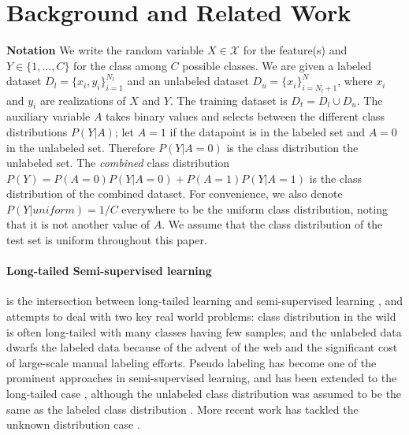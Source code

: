 \section{Background and Related Work}
\label{sec:background}

\textbf{Notation} We write the random variable $X \in \mathcal{X}$ for the feature(s) and  $Y \in \{1,\dots, C\}$ for the class among $C$ possible classes. We are given a labeled dataset $D_l = \{x_i,y_i\}_{i=1}^{N_l}$ and an unlabeled dataset $D_u = \{x_i\}_{i=N_l+1}^N$, where $x_i$ and $y_i$ are realizations of $X$ and $Y$. The training dataset is $D_t = D_l \cup D_u$. 
The auxiliary variable $A$ takes binary values and selects between the different class distributions $P(Y|A)$; let $A=1$ if the datapoint is in the labeled set and $A=0$ in the unlabeled set. 
Therefore $P(Y|A=0)$ is the class distribution the unlabeled set. The \textit{combined} class distribution $P(Y) = P(A=0)P(Y|A=0) + P(A=1)P(Y|A=1)$ is the class distribution of the combined dataset. For convenience, we also denote $P(Y|\textit{uniform})=1/C$ everywhere to be the uniform class distribution, noting that it is not another value of $A$. We assume that the class distribution of the test set is uniform throughout this paper.

\paragraph{Long-tailed Semi-supervised learning} is the intersection between long-tailed learning \cite{longtailedlearning} and semi-supervised learning \cite{chapelle2009semi}, and attempts to deal with two key real world problems: class distribution in the wild is often long-tailed with many classes having few samples; and the unlabeled data dwarfs the labeled data because of the advent of the web and the significant cost of large-scale manual labeling efforts. Pseudo labeling \cite{pseudolabeling, mixmatch, google-selftraining, temporalensembling} has become one of the prominent approaches in semi-supervised learning, and has been extended to the long-tailed case \cite{crest, abc}, although the unlabeled class distribution was assumed to be the same as the labeled class distribution \cite{remixmatch}. More recent work has tackled the unknown distribution case \cite{dcssl, rda, onnonrandommissinglabels, prg4ssl, acr, simpro, cpe, boat}.

